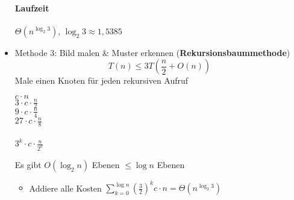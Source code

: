 \begin{itemize}
        \paragraph*{Laufzeit} $\Theta(n^{\log_2 3})$, $\log_2 3 \approx 1{,}5385$
\item   Methode 3: Bild malen \& Muster erkennen (\textbf{Rekursionsbaummethode})
        \[T(n) \leq 3 T\left(\frac{n}{2} + O(n)\right)\]
        Male einen Knoten für jeden rekursiven Aufruf
        \begin{center}
        \begin{minipage}{0.3\textwidth}
        \end{minipage}
        \vline
        \begin{minipage}{0.3\textwidth}
            \centering
            $c \cdot n$ \\[0.3cm]
            $3 \cdot c \cdot \frac{n}{2}$ \\[0.3cm]
            $9 \cdot c \cdot \frac{n}{4}$ \\[0.3cm]
            $27 \cdot c \cdot \frac{n}{8}$ \\[0.3cm]
            \hspace{0cm} \\[0.3cm]
            $3^k \cdot c \cdot \frac{n}{2^k}$
        \end{minipage}
        \end{center}
        Es gibt $O(\log_2 n)$ Ebenen $\leq \log n$ Ebenen
        \begin{itemize}
        \item Addiere alle Kosten $\sum\limits_{k = 0}^{\log n} \left(\frac{3}{2}\right)^k c \cdot n = \Theta(n^{\log_2 3})$

\end{itemize}
\end{itemize}
